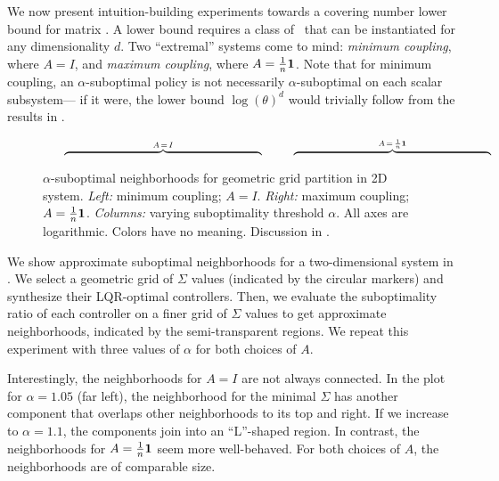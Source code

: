 \label{sec:matrix-lb-ideas}

We now present intuition-building experiments towards a covering number lower bound
for matrix \DDFproblems.
A lower bound requires
a class of \DDFproblem\
that can be instantiated for any dimensionality $d$.
Two ``extremal'' systems come to mind:
\emph{minimum coupling},
where $A = \textstyle I$,
and \emph{maximum coupling},
where $A = \textstyle \frac{1}{n} \mathbf{1}$.
Note that for minimum coupling,
an $\alpha$-suboptimal policy
is not necessarily $\alpha$-suboptimal on each scalar subsystem---%
if it were, the lower bound $\log (\theta)^d$ would trivially follow
from the results in \Cref{sec:results-scalar}.




\label{sec:2d-visualization}

\begin{figure}[t]
	\(
		\hspace{7mm}
		\overbrace{\hspace{65mm}}^{A \mathop{=} I}
		\hspace{10mm}
		\overbrace{\hspace{65mm}}^{A \mathop{=} \recip n \one}
	\)
	\vspace{-2mm}
	\caption{
		$\alpha$-suboptimal neighborhoods
		for geometric grid partition in 2D system.
		\emph{Left:}
		minimum coupling; $A = I$.
		\emph{Right:}
		maximum coupling; $A = \frac{1}{n} \mathbf{1}$.
		\emph{Columns:} varying suboptimality threshold $\alpha$.
		All axes are logarithmic. %
		Colors have no meaning.
		Discussion in .
	}
	\label{fig:neighborhoods-2x2}
\end{figure}


We show approximate suboptimal neighborhoods
for a two-dimensional system in .
We select a geometric grid of $\Sigma$ values (indicated by the circular markers)
and synthesize their LQR-optimal controllers.
Then, we evaluate the suboptimality ratio of each controller on a finer grid of $\Sigma$ values
to get approximate neighborhoods, indicated by the semi-transparent regions.
We repeat this experiment
with three values of $\alpha$
for both choices of $A$.

Interestingly, the neighborhoods for $A=I$ are not always connected.
In the plot for ${\alpha = 1.05}$ (far left),
the neighborhood for the minimal $\Sigma$
has another component that overlaps other neighborhoods
to its top and right.
If we increase to $\alpha = 1.1$,
the components join
into an ``L''-shaped region.
In contrast, the neighborhoods for $A = \frac{1}{n} \mathbf{1}$ seem more well-behaved.
For both choices of $A$,
the neighborhoods are of comparable size.


